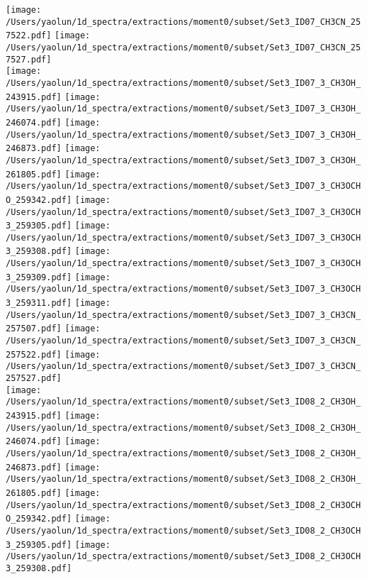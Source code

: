 \begin{figure*}[htbp!]
  \texttt{[image: /Users/yaolun/1d\_spectra/extractions/moment0/subset/Set3\_ID07\_CH3CN\_257522.pdf]}
  \texttt{[image: /Users/yaolun/1d\_spectra/extractions/moment0/subset/Set3\_ID07\_CH3CN\_257527.pdf]}
  \\
  \texttt{[image: /Users/yaolun/1d\_spectra/extractions/moment0/subset/Set3\_ID07\_3\_CH3OH\_243915.pdf]}
  \texttt{[image: /Users/yaolun/1d\_spectra/extractions/moment0/subset/Set3\_ID07\_3\_CH3OH\_246074.pdf]}
  \texttt{[image: /Users/yaolun/1d\_spectra/extractions/moment0/subset/Set3\_ID07\_3\_CH3OH\_246873.pdf]}
  \texttt{[image: /Users/yaolun/1d\_spectra/extractions/moment0/subset/Set3\_ID07\_3\_CH3OH\_261805.pdf]}
  \texttt{[image: /Users/yaolun/1d\_spectra/extractions/moment0/subset/Set3\_ID07\_3\_CH3OCHO\_259342.pdf]}
  \texttt{[image: /Users/yaolun/1d\_spectra/extractions/moment0/subset/Set3\_ID07\_3\_CH3OCH3\_259305.pdf]}
  \texttt{[image: /Users/yaolun/1d\_spectra/extractions/moment0/subset/Set3\_ID07\_3\_CH3OCH3\_259308.pdf]}
  \texttt{[image: /Users/yaolun/1d\_spectra/extractions/moment0/subset/Set3\_ID07\_3\_CH3OCH3\_259309.pdf]}
  \texttt{[image: /Users/yaolun/1d\_spectra/extractions/moment0/subset/Set3\_ID07\_3\_CH3OCH3\_259311.pdf]}
  \texttt{[image: /Users/yaolun/1d\_spectra/extractions/moment0/subset/Set3\_ID07\_3\_CH3CN\_257507.pdf]}
  \texttt{[image: /Users/yaolun/1d\_spectra/extractions/moment0/subset/Set3\_ID07\_3\_CH3CN\_257522.pdf]}
  \texttt{[image: /Users/yaolun/1d\_spectra/extractions/moment0/subset/Set3\_ID07\_3\_CH3CN\_257527.pdf]}
  \\
  \texttt{[image: /Users/yaolun/1d\_spectra/extractions/moment0/subset/Set3\_ID08\_2\_CH3OH\_243915.pdf]}
  \texttt{[image: /Users/yaolun/1d\_spectra/extractions/moment0/subset/Set3\_ID08\_2\_CH3OH\_246074.pdf]}
  \texttt{[image: /Users/yaolun/1d\_spectra/extractions/moment0/subset/Set3\_ID08\_2\_CH3OH\_246873.pdf]}
  \texttt{[image: /Users/yaolun/1d\_spectra/extractions/moment0/subset/Set3\_ID08\_2\_CH3OH\_261805.pdf]}
  \texttt{[image: /Users/yaolun/1d\_spectra/extractions/moment0/subset/Set3\_ID08\_2\_CH3OCHO\_259342.pdf]}
  \texttt{[image: /Users/yaolun/1d\_spectra/extractions/moment0/subset/Set3\_ID08\_2\_CH3OCH3\_259305.pdf]}
  \texttt{[image: /Users/yaolun/1d\_spectra/extractions/moment0/subset/Set3\_ID08\_2\_CH3OCH3\_259308.pdf]}

\end{figure*}

